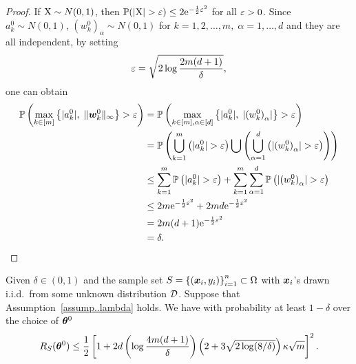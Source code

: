 \documentclass[twoside,11pt]{article}
\begin{document}
\begin{proof}
    If $\textnormal{X} \sim N(0, 1)$, then $\mathbb{P}(\lvert\textnormal{X}\rvert > \varepsilon) \leq 2\mathrm{e}^{-\frac{1}{2}\varepsilon^2}$ for all $\varepsilon > 0$. Since $a^0_k\sim N(0,1)$, ${(w_k^0)}_{\alpha}\sim N(0,1)$ for $k=1, 2, \ldots, m,\; \alpha =1,\ldots,d$ and they are all independent, by setting
    \begin{equation*}
        \varepsilon = \sqrt{2\log\frac{2m(d+1)}{\delta}},
    \end{equation*}
    one can obtain
    \begin{equation*}
        \begin{aligned}
            \mathbb{P}\left(\max\limits_{k\in[m]}\left\{\lvert a_k^0\rvert,\; \lVert\bm{w}_k^0\rVert_{\infty}\right \}>\varepsilon\right)
             & = \mathbb{P}\left(\max\limits_{k\in[m],\alpha\in[d]}\left\{\lvert a_k^0\rvert,\; \lvert{(w^0_k)}_{\alpha}\rvert\right \}>\varepsilon\right)                                            \\
             & = \mathbb{P}\left(\bigcup\limits_{k=1}^m\left(\lvert a_k^0\rvert>\varepsilon\right)\bigcup\left(\bigcup\limits_{\alpha=1}^d\left(\lvert{(w_k^0)}_{\alpha}\rvert>\varepsilon\right)\right)\right) \\
             & \leq \sum_{k=1}^m \mathbb{P}\left(\lvert a_k^0\rvert>\varepsilon\right) + \sum_{k=1}^m\sum_{\alpha=1}^d \mathbb{P}\left(\lvert{(w^0_k)}_{\alpha}\rvert>\varepsilon\right)                          \\
             & \leq 2m \mathrm{e}^{-\frac{1}{2}\varepsilon^2} + 2md \mathrm{e}^{-\frac{1}{2}\varepsilon^2}                                                                                                 \\
             & = 2m(d+1)\mathrm{e}^{-\frac{1}{2}\varepsilon^2}                                                                                                                              \\
             & = \delta.
        \end{aligned}
    \end{equation*}
\end{proof}
\begin{lem}
    Given $\delta\in(0,1)$ and the sample set $S = {\{(\bm{x}_i, y_i)\}}_{i=1}^n\subset\Omega$ with $\bm{x}_i$'s drawn i.i.d.\ from some unknown distribution $\mathcal{D}$. Suppose that Assumption~\ref{assump..lambda} holds. We have with probability at least $1-\delta$ over the choice of $\bm{\theta}^0$
    \begin{equation}
        R_S(\bm{\theta}^0)\leq\frac{1}{2}\left[1 + 2d\left(\log\frac{4m(d+1)}{\delta}\right)\left(2+3\sqrt{2\log(8/\delta)}\right)\kappa\sqrt{m}\right]^2.
    \end{equation}
\end{lem}
\end{document}
